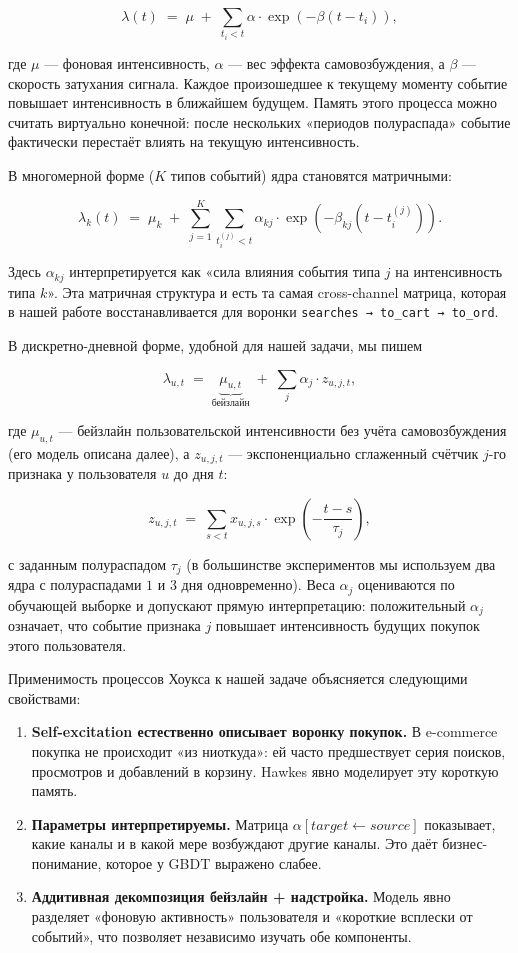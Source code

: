 \documentclass[12pt,a4paper]{article}
\begin{document}
\[
\lambda(t) \;=\; \mu \;+\; \sum_{t_i < t} \alpha \cdot \exp\!\left(-\beta (t - t_i)\right),
\]

где $\mu $ --- фоновая интенсивность, $\alpha $ --- вес эффекта самовозбуждения, а $\beta $ --- скорость затухания сигнала.
Каждое произошедшее к текущему моменту событие повышает интенсивность в ближайшем будущем. Память этого процесса можно считать виртуально конечной: после нескольких «периодов полураспада» событие фактически перестаёт влиять на текущую интенсивность.

В многомерной форме ($K$ типов событий) ядра становятся матричными:

\[
\lambda_k(t) \;=\; \mu_k \;+\; \sum_{j=1}^{K} \sum_{t_i^{(j)} < t} \alpha_{kj} \cdot \exp\!\left(-\beta_{kj} (t - t_i^{(j)})\right).
\]

Здесь $\alpha _{kj}$ интерпретируется как «сила влияния события типа $j$ на интенсивность типа $k$». Эта матричная структура и есть та самая cross-channel матрица, которая в нашей работе восстанавливается для воронки \texttt{searches → to\_cart → to\_ord}.

В дискретно-дневной форме, удобной для нашей задачи, мы пишем

\[
\lambda_{u,t} \;=\; \underbrace{\mu_{u,t}}_{\text{бейзлайн}} \;+\; \sum_{j} \alpha_j \cdot z_{u,j,t},
\]

где $\mu _{u,t}$ --- бейзлайн пользовательской интенсивности без учёта самовозбуждения (его модель описана далее), а $z_{u,j,t}$ --- экспоненциально сглаженный счётчик $j$-го признака у пользователя $u$ до дня $t$:

\[
z_{u,j,t} \;=\; \sum_{s < t} x_{u,j,s} \cdot \exp\!\left(-\frac{t - s}{\tau_j}\right),
\]

с заданным полураспадом $\tau _j$ (в большинстве экспериментов мы используем два ядра с полураспадами $1$ и $3$ дня одновременно). Веса $\alpha _j$ оцениваются по обучающей выборке и допускают прямую интерпретацию: положительный $\alpha _j$ означает, что событие признака $j$ повышает интенсивность будущих покупок этого пользователя.

Применимость процессов Хоукса к нашей задаче объясняется следующими свойствами:

\begin{enumerate}
  \item \textbf{Self-excitation естественно описывает воронку покупок.} В e-commerce покупка не происходит «из ниоткуда»: ей часто предшествует серия поисков, просмотров и добавлений в корзину. Hawkes явно моделирует эту короткую память.
  \item \textbf{Параметры интерпретируемы.} Матрица $\alpha [target \leftarrow  source]$ показывает, какие каналы и в какой мере возбуждают другие каналы. Это даёт бизнес-понимание, которое у GBDT выражено слабее.
  \item \textbf{Аддитивная декомпозиция бейзлайн + надстройка.} Модель явно разделяет «фоновую активность» пользователя и «короткие всплески от событий», что позволяет независимо изучать обе компоненты.
\end{enumerate}
\end{document}
